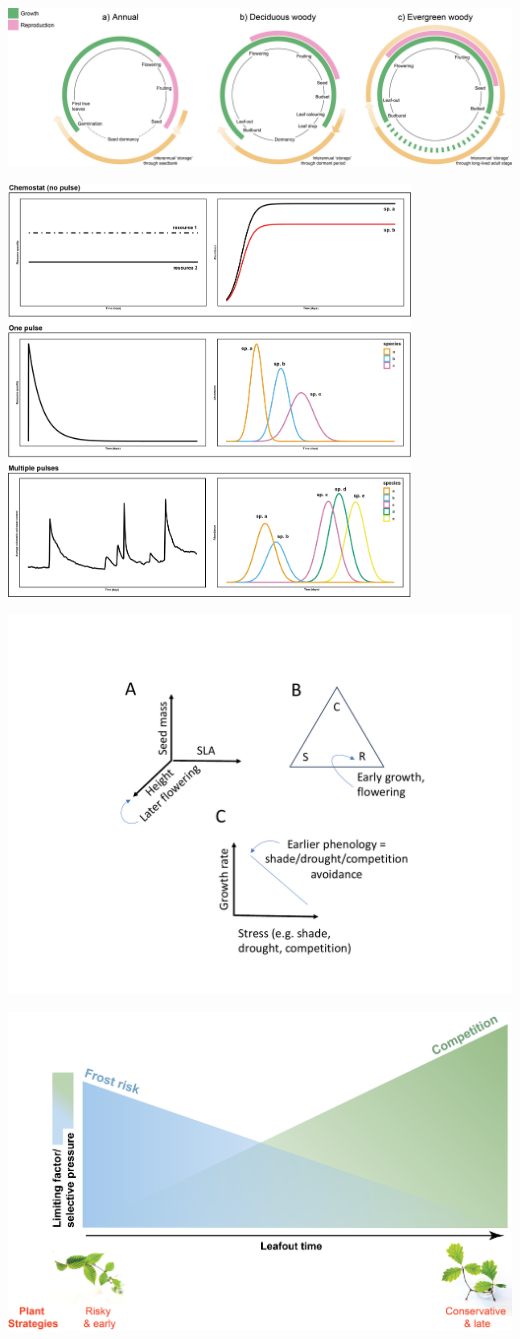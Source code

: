 \documentclass[11pt]{article}
\begin{document}
\includegraphics[width=1\textwidth]{..//figures/figsubmit/phenologyCirclesStorage.png}

\clearpage
\includegraphics[width=0.8\textwidth]{..//figures/figsubmit/sixpanel_concept_increasespp.png}


\clearpage
\includegraphics[width=1\textwidth]{..//figures/figsubmit/AREESfigure.pdf}


\clearpage
\includegraphics[width=1\textwidth]{..//figures/figsubmit/frosttradeoffs2.png}
\end{document}

